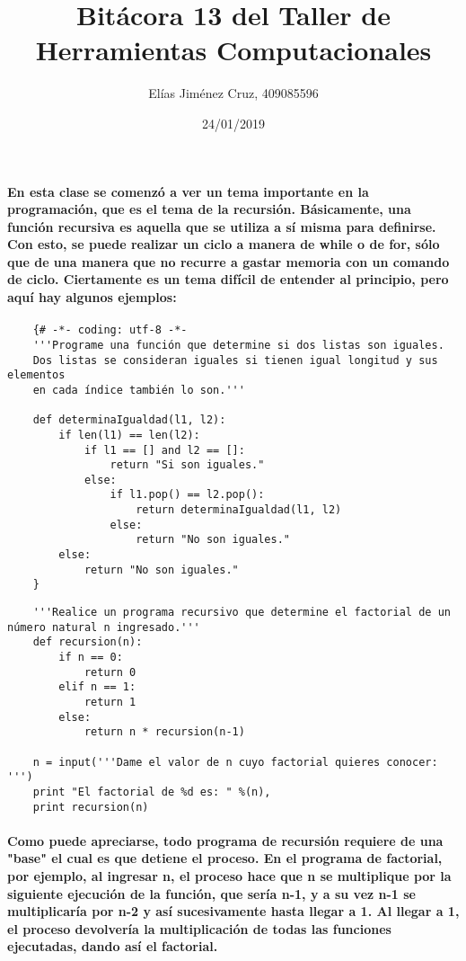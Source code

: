 \documentclass[letterpaper, 12pt, oneside]{article} %
\title{\Huge Bitácora 13 del Taller de Herramientas Computacionales}
\author{Elías Jiménez Cruz, 409085596}
\date{24/01/2019}
\begin{document}
	\maketitle
	\paragraph{En esta clase se comenzó a ver un tema importante en la programación, que es el tema de la recursión. Básicamente, una función recursiva es aquella que se utiliza a sí misma para definirse. Con esto, se puede realizar un ciclo a manera de while o de for, sólo que de una manera que no recurre a gastar memoria con un comando de ciclo. Ciertamente es un tema difícil de entender al principio, pero aquí hay algunos ejemplos:}
	\begin{verbatim}
	{# -*- coding: utf-8 -*-
	'''Programe una función que determine si dos listas son iguales.
	Dos listas se consideran iguales si tienen igual longitud y sus elementos
	en cada índice también lo son.'''
	
	def determinaIgualdad(l1, l2):
		if len(l1) == len(l2):
			if l1 == [] and l2 == []:
				return "Si son iguales."
			else:
				if l1.pop() == l2.pop():
					return determinaIgualdad(l1, l2)
				else:
					return "No son iguales."
		else:
			return "No son iguales."
	}
	\end{verbatim}
	\begin{verbatim}
	'''Realice un programa recursivo que determine el factorial de un número natural n ingresado.'''
	def recursion(n):
		if n == 0:
			return 0
		elif n == 1:
			return 1
		else:
			return n * recursion(n-1)
	
	n = input('''Dame el valor de n cuyo factorial quieres conocer: ''')
	print "El factorial de %d es: " %(n),
	print recursion(n)
	\end{verbatim}
	\paragraph{Como puede apreciarse, todo programa de recursión requiere de una "base" el cual es que detiene el proceso. En el programa de factorial, por ejemplo, al ingresar n, el proceso hace que n se multiplique por la siguiente ejecución de la función, que sería n-1, y a su vez n-1 se multiplicaría por n-2 y así sucesivamente hasta llegar a 1. Al llegar a 1, el proceso devolvería la multiplicación de todas las funciones ejecutadas, dando así el factorial.}
\end{document}
